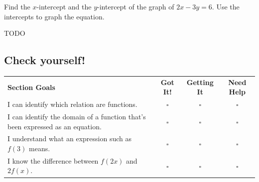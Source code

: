 \documentclass[oneside,10pt]{book}
\begin{document}
\newpage



\example
Find the $x$-intercept and the $y$-intercept of the graph of
$2x-3y=6$.
Use the intercepts to graph the equation.

\vfill






TODO
\subsection*{Check yourself!}

\noindent
\begin{tabular}{@{}p{4.5in} c c c@{}}
\textbf{Section Goals} & \textbf{Got It!} & \textbf{Getting It} & \textbf{Need Help}\\
I can identify which relation are functions. & $\square$ & $\square$ & $\square $ \\
I can identify the domain of a function that's been expressed as an equation. & $\square$ & $\square$ & $\square $ \\
I understand what an expression such as $f(3)$ means. & $\square$ & $\square$ & $\square $ \\
I know the difference between $f(2x)$ and $2f(x)$. & $\square$ & $\square$ & $\square $ \\


\end{tabular}
\end{document}
